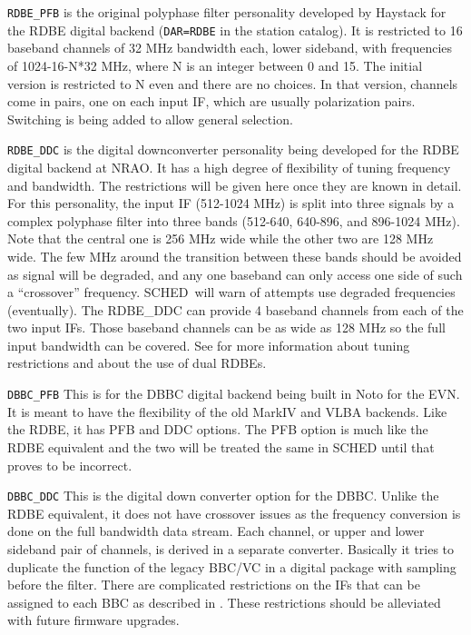 \documentclass{report}
\newcommand{\schedb}{{\sc SCHED~}}
\begin{document}
\begin{description}

\item {\tt RDBE\_PFB} is the original polyphase filter personality
developed by Haystack for the RDBE digital backend ({\tt DAR=RDBE} in
the station catalog).  It is restricted to 16 baseband channels of 32
MHz bandwidth each, lower sideband, with frequencies of 1024-16-N*32
MHz, where N is an integer between 0 and 15.  The initial version is
restricted to N even and there are no choices.  In that version,
channels come in pairs, one on each input IF, which are usually
polarization pairs.  Switching is being added to allow general
selection.

\item {\tt RDBE\_DDC} is the digital downconverter personality being
developed for the RDBE digital backend at NRAO.  It has a high degree
of flexibility of tuning frequency and bandwidth.  The restrictions
will be given here once they are known in detail.  For this personality,
the input IF (512-1024 MHz) is split into three signals by a complex
polyphase filter into three bands (512-640, 640-896, and 896-1024 MHz).
Note that the central one is 256 MHz wide while the other two are 128
MHz wide.  The few MHz around the transition between these bands should
be avoided as signal will be degraded, and any one baseband can only
access one side of such a ``crossover'' frequency.  \schedb will warn
of attempts use degraded frequencies (eventually).  The RDBE\_DDC can
provide 4 baseband channels from each of the two input IFs.  Those
baseband channels can be as wide as 128 MHz so the full input bandwidth
can be covered.  See 
for more information about tuning restrictions and about the use of
dual RDBEs.

\item {\tt DBBC\_PFB} This is for the DBBC digital backend being built in
Noto for the EVN.  It is meant to have the flexibility of the old
MarkIV and VLBA backends.  Like the RDBE, it has PFB and DDC options.  
The PFB option is much like the RDBE equivalent and the two will be treated
the same in SCHED until that proves to be incorrect.

\item {\tt DBBC\_DDC} This is the digital down converter option for
the DBBC.  Unlike the RDBE equivalent, it does not have crossover issues
as the frequency conversion is done on the full bandwidth data stream.
Each channel, or upper and lower sideband pair of channels, is derived
in a separate converter.  Basically it tries to duplicate the function
of the legacy BBC/VC in a digital package with sampling before the
filter.  There are complicated restrictions on the IFs that can be
assigned to each BBC as described in .
These restrictions should be alleviated with future firmware upgrades.


\end{description}
\end{document}
